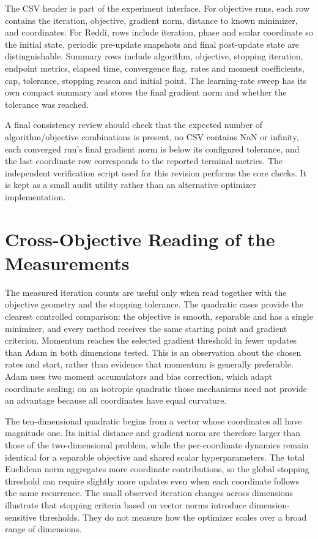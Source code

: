 \documentclass[conference]{IEEEtran}
\begin{document}
The CSV header is part of the experiment interface. For objective runs, each row contains the iteration, objective, gradient norm, distance to known minimizer, and coordinates. For Reddi, rows include iteration, phase and scalar coordinate so the initial state, periodic pre-update snapshots and final post-update state are distinguishable. Summary rows include algorithm, objective, stopping iteration, endpoint metrics, elapsed time, convergence flag, rates and moment coefficients, cap, tolerance, stopping reason and initial point. The learning-rate sweep has its own compact summary and stores the final gradient norm and whether the tolerance was reached.

A final consistency review should check that the expected number of algorithm/objective combinations is present, no CSV contains NaN or infinity, each converged run's final gradient norm is below its configured tolerance, and the last coordinate row corresponds to the reported terminal metrics. The independent verification script used for this revision performs the core checks. It is kept as a small audit utility rather than an alternative optimizer implementation.

\section{Cross-Objective Reading of the Measurements}
The measured iteration counts are useful only when read together with the objective geometry and the stopping tolerance. The quadratic cases provide the clearest controlled comparison: the objective is smooth, separable and has a single minimizer, and every method receives the same starting point and gradient criterion. Momentum reaches the selected gradient threshold in fewer updates than Adam in both dimensions tested. This is an observation about the chosen rates and start, rather than evidence that momentum is generally preferable. Adam uses two moment accumulators and bias correction, which adapt coordinate scaling; on an isotropic quadratic those mechanisms need not provide an advantage because all coordinates have equal curvature.

The ten-dimensional quadratic begins from a vector whose coordinates all have magnitude one. Its initial distance and gradient norm are therefore larger than those of the two-dimensional problem, while the per-coordinate dynamics remain identical for a separable objective and shared scalar hyperparameters. The total Euclidean norm aggregates more coordinate contributions, so the global stopping threshold can require slightly more updates even when each coordinate follows the same recurrence. The small observed iteration changes across dimensions illustrate that stopping criteria based on vector norms introduce dimension-sensitive thresholds. They do not measure how the optimizer scales over a broad range of dimensions.
\end{document}
